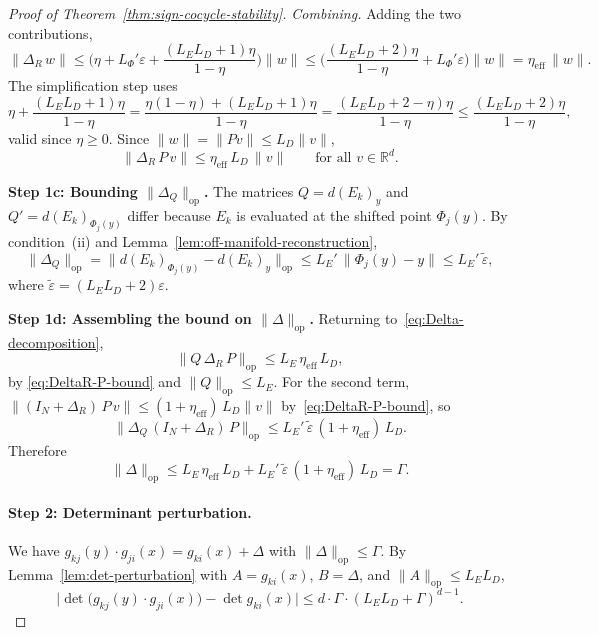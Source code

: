 \documentclass[11pt]{article}
\newcommand{\R}{\mathbb{R}}
\theoremstyle{plain}
\theoremstyle{definition}
\theoremstyle{remark}
\begin{document}
\begin{appendices}
\begin{proof}[Proof of Theorem~\ref{thm:sign-cocycle-stability}]
\emph{Combining.} Adding the two contributions,
\begin{equation}\label{eq:restricted-DeltaR}
\|\Delta_R\,w\|
\leq \biggl(\eta + L_\Phi'\varepsilon + \frac{(L_E L_D + 1)\eta}{1 - \eta}\biggr)\|w\|
\leq \biggl(\frac{(L_E L_D + 2)\eta}{1 - \eta} + L_\Phi'\varepsilon\biggr)\|w\|
= \eta_{\mathrm{eff}}\,\|w\|.
\end{equation}
The simplification step uses
\[
\eta + \frac{(L_E L_D + 1)\eta}{1 - \eta} = \frac{\eta(1 - \eta) + (L_E L_D + 1)\eta}{1 - \eta} = \frac{(L_E L_D + 2 - \eta)\eta}{1 - \eta} \leq \frac{(L_E L_D + 2)\eta}{1 - \eta},
\]
valid since $\eta \geq 0$. Since $\|w\| = \|Pv\| \leq L_D\|v\|$,
\begin{equation}\label{eq:DeltaR-P-bound}
\|\Delta_R\,P\,v\| \leq \eta_{\mathrm{eff}}\,L_D\,\|v\| \qquad \text{for all } v \in \R^d.
\end{equation}

\medskip

\textbf{Step 1c: Bounding $\|\Delta_Q\|_{\mathrm{op}}$.}
The matrices $Q = d(E_k)_y$ and $Q' = d(E_k)_{\Phi_j(y)}$ differ because $E_k$ is evaluated at the shifted point $\Phi_j(y)$. By condition~(ii) and Lemma~\ref{lem:off-manifold-reconstruction},
\begin{equation}\label{eq:DeltaQ-bound}
\|\Delta_Q\|_{\mathrm{op}} = \|d(E_k)_{\Phi_j(y)} - d(E_k)_y\|_{\mathrm{op}}
\leq L_E'\,\|\Phi_j(y) - y\| \leq L_E'\,\widetilde{\varepsilon},
\end{equation}
where $\widetilde{\varepsilon} = (L_E L_D + 2)\varepsilon$.

\medskip

\textbf{Step 1d: Assembling the bound on $\|\Delta\|_{\mathrm{op}}$.}
Returning to~\eqref{eq:Delta-decomposition},
\[
\|Q\,\Delta_R\,P\|_{\mathrm{op}} \leq L_E\,\eta_{\mathrm{eff}}\,L_D,
\]
by \eqref{eq:DeltaR-P-bound} and $\|Q\|_{\mathrm{op}} \leq L_E$. For the second term, $\|(I_N + \Delta_R)\,P\,v\| \leq (1 + \eta_{\mathrm{eff}})\,L_D\|v\|$ by~\eqref{eq:DeltaR-P-bound}, so
\[
\|\Delta_Q\,(I_N + \Delta_R)\,P\|_{\mathrm{op}}
\leq L_E'\,\widetilde{\varepsilon}\,(1 + \eta_{\mathrm{eff}})\,L_D.
\]
Therefore
\begin{equation}\label{eq:Delta-bound}
\|\Delta\|_{\mathrm{op}}
\leq L_E\,\eta_{\mathrm{eff}}\,L_D + L_E'\,\widetilde{\varepsilon}\,(1 + \eta_{\mathrm{eff}})\,L_D
= \Gamma.
\end{equation}

\paragraph{Step 2: Determinant perturbation.}
We have $g_{kj}(y) \cdot g_{ji}(x) = g_{ki}(x) + \Delta$ with $\|\Delta\|_{\mathrm{op}} \leq \Gamma$. By Lemma~\ref{lem:det-perturbation} with $A = g_{ki}(x)$, $B = \Delta$, and $\|A\|_{\mathrm{op}} \leq L_E L_D$,
\begin{equation}\label{eq:det-perturbation-bound}
\bigl|\det\bigl(g_{kj}(y) \cdot g_{ji}(x)\bigr) - \det g_{ki}(x)\bigr|
\leq d \cdot \Gamma \cdot (L_E L_D + \Gamma)^{d-1}.
\end{equation}


\end{proof}
\end{appendices}
\end{document}
